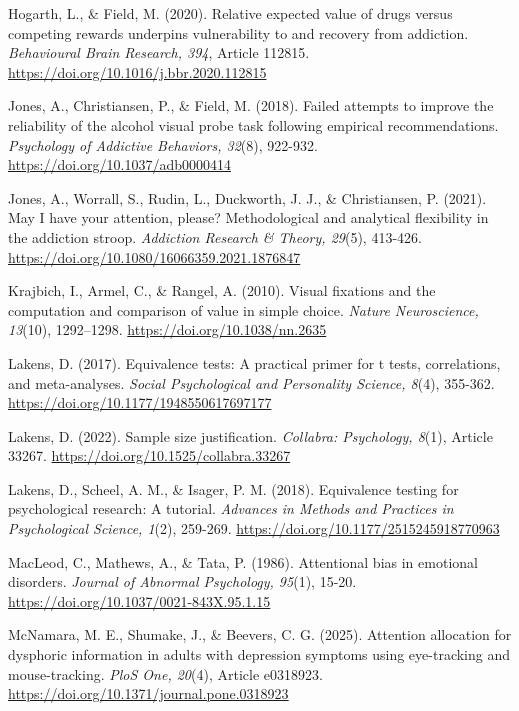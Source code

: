 \documentclass[authordate, reflection, issue]{jote-new-article}
\begin{document}
	Hogarth, L., \& Field, M. (2020). Relative expected value of drugs versus competing rewards underpins vulnerability to and recovery from addiction. \emph{Behavioural Brain Research, 394}, Article 112815. \url{https://doi.org/10.1016/j.bbr.2020.112815}



	Jones, A., Christiansen, P., \& Field, M. (2018). Failed attempts to improve the reliability of the alcohol visual probe task following empirical recommendations. \emph{Psychology of Addictive Behaviors, 32}(8), 922-932. \url{https://doi.org/10.1037/adb0000414}



	Jones, A., Worrall, S., Rudin, L., Duckworth, J. J., \& Christiansen, P. (2021). May I have your attention, please? Methodological and analytical flexibility in the addiction stroop. \emph{Addiction Research \& Theory, 29}(5), 413-426. \url{https://doi.org/10.1080/16066359.2021.1876847}



	Krajbich, I., Armel, C., \& Rangel, A. (2010). Visual fixations and the computation and comparison of value in simple choice. \emph{Nature Neuroscience, 13}(10), 1292--1298. \url{https://doi.org/10.1038/nn.2635}



	Lakens, D. (2017). Equivalence tests: A practical primer for t tests, correlations, and meta-analyses. \emph{Social Psychological and Personality Science, 8}(4), 355-362. \url{https://doi.org/10.1177/1948550617697177}



	Lakens, D. (2022). Sample size justification. \emph{Collabra: Psychology, 8}(1), Article 33267. \url{https://doi.org/10.1525/collabra.33267}



	Lakens, D., Scheel, A. M., \& Isager, P. M. (2018). Equivalence testing for psychological research: A tutorial. \emph{Advances in Methods and Practices in Psychological Science, 1}(2), 259-269. \url{https://doi.org/10.1177/2515245918770963}



	MacLeod, C., Mathews, A., \& Tata, P. (1986). Attentional bias in emotional disorders. \emph{Journal of Abnormal Psychology, 95}(1), 15-20. \url{https://doi.org/10.1037/0021-843X.95.1.15}



	McNamara, M. E., Shumake, J., \& Beevers, C. G. (2025). Attention allocation for dysphoric information in adults with depression symptoms using eye-tracking and mouse-tracking. \emph{PloS One, 20}(4), Article e0318923. \url{https://doi.org/10.1371/journal.pone.0318923}
\end{document}
